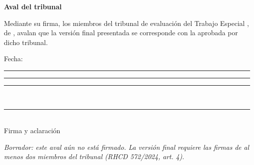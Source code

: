 \thispagestyle{empty}
\begin{center}
  {\Large\bfseries Aval del tribunal\par}
\end{center}

\vspace{1.2cm}

Mediante su firma, los miembros del tribunal de evaluación del Trabajo Especial
\textit{\ThesisTitle}, de \ThesisAuthor, avalan que la versión final presentada
se corresponde con la aprobada por dicho tribunal.

\vspace{0.8cm}
\noindent Fecha: \rule{7cm}{0.4pt}

\vspace{1.8cm}
\noindent\rule{0.46\textwidth}{0.4pt}\hfill\rule{0.46\textwidth}{0.4pt}\\
\noindent{}\hfill
{}

\vspace{1.8cm}
\begin{center}
  \rule{0.46\textwidth}{0.4pt}\\
  Firma y aclaración
\end{center}

\ifThesisFinalLayout\else
  \vfill
  \begin{center}
    \small\textit{Borrador: este aval aún no está firmado. La versión final
    requiere las firmas de al menos dos miembros del tribunal (RHCD 572/2024, art. 4).}
  \end{center}
\fi
